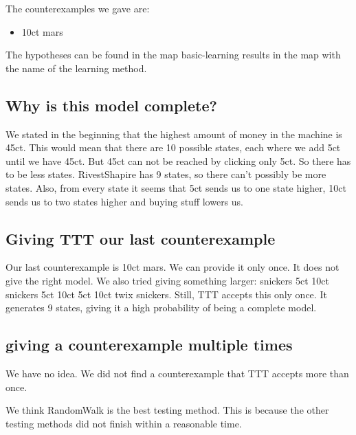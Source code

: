 \documentclass[11pt,a4paper]{article}
\begin{document}
The counterexamples we gave are:
\begin{itemize}
	\item 10ct mars
\end{itemize}

The hypotheses can be found in the map basic-learning results in the map with the name of the learning method.

\subsection{Why is this model complete?}
We stated in the beginning that the highest amount of money in the machine is 45ct. This would mean that there are 10 possible states, each where we add 5ct until we have 45ct. But 45ct can not be reached by clicking only 5ct. So there has to be less states. RivestShapire has 9 states, so there can't possibly be more states. Also, from every state it seems that 5ct sends us to one state higher, 10ct sends us to two states higher and buying stuff lowers us.




\subsection{Giving TTT our last counterexample}
Our last counterexample is 10ct mars. We can provide it only once. It does not give the right model.
We also tried giving something larger: snickers 5ct 10ct snickers 5ct 10ct 5ct 10ct twix snickers.
Still, TTT accepts this only once. It generates 9 states, giving it a high probability of being a complete model.

\subsection{giving a counterexample multiple times}
We have no idea. We did not find a counterexample that TTT accepts more than once.

We think RandomWalk is the best testing method. This is because the
other testing methods did not finish within a reasonable time.
\end{document}
